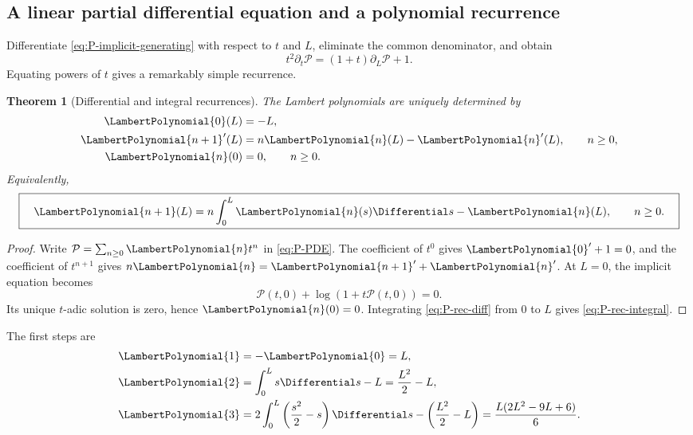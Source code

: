 \documentclass[11pt]{article}
\theoremstyle{pltheorem}
\newtheorem{theorem}{Theorem}[section]
\begin{document}
\subsection{A linear partial differential equation and a polynomial recurrence}

Differentiate \cref{eq:P-implicit-generating} with respect to \(t\) and \(L\), eliminate the common denominator, and obtain
\begin{equation}\label{eq:P-PDE}
 \boxed{\quad
 t^2\partial_t\mathcal P=(1+t)\partial_L\mathcal P+1.
 \quad}
\end{equation}
Equating powers of \(t\) gives a remarkably simple recurrence.

\begin{theorem}[Differential and integral recurrences]\label{thm:P-recurrence}
The Lambert polynomials are uniquely determined by
\begin{align}
 \LambertPolynomial{0}(L)&=-L,\label{eq:P-rec-P0}\\
 {\LambertPolynomial{n+1}}'(L)&=n\LambertPolynomial{n}(L)-{\LambertPolynomial{n}}'(L),\qquad n\ge0,
 \label{eq:P-rec-diff}\\
 \LambertPolynomial{n}(0)&=0,\qquad n\ge0.
 \label{eq:P-zero}
\end{align}
Equivalently,
\begin{equation}\label{eq:P-rec-integral}
 \boxed{\quad
 \LambertPolynomial{n+1}(L)=n\int_0^L \LambertPolynomial{n}(s)\Differential s-\LambertPolynomial{n}(L),
 \qquad n\ge0.
 \quad}
\end{equation}
\end{theorem}

\begin{proof}
Write \(\mathcal P=\sum_{n\ge0}\LambertPolynomial{n}t^n\) in \cref{eq:P-PDE}.  The coefficient of \(t^0\) gives \({\LambertPolynomial{0}}'+1=0\), and the coefficient of \(t^{n+1}\) gives
\(n\LambertPolynomial{n}={\LambertPolynomial{n+1}}'+{\LambertPolynomial{n}}'\).  At \(L=0\), the implicit equation becomes
\[
 \mathcal P(t,0)+\log(1+t\mathcal P(t,0))=0.
\]
Its unique \(t\)-adic solution is zero, hence \(\LambertPolynomial{n}(0)=0\).  Integrating \cref{eq:P-rec-diff} from \(0\) to \(L\) gives \cref{eq:P-rec-integral}.
\end{proof}

The first steps are
\begin{align*}
 \LambertPolynomial{1}&=-\LambertPolynomial{0}=L,\\
 \LambertPolynomial{2}&=\int_0^L s\Differential s-L=\frac{L^2}{2}-L,\\
 \LambertPolynomial{3}&=2\int_0^L\left(\frac{s^2}{2}-s\right)\Differential s
 -\left(\frac{L^2}{2}-L\right)
 =\frac{L(2L^2-9L+6)}6.
\end{align*}
\end{document}
